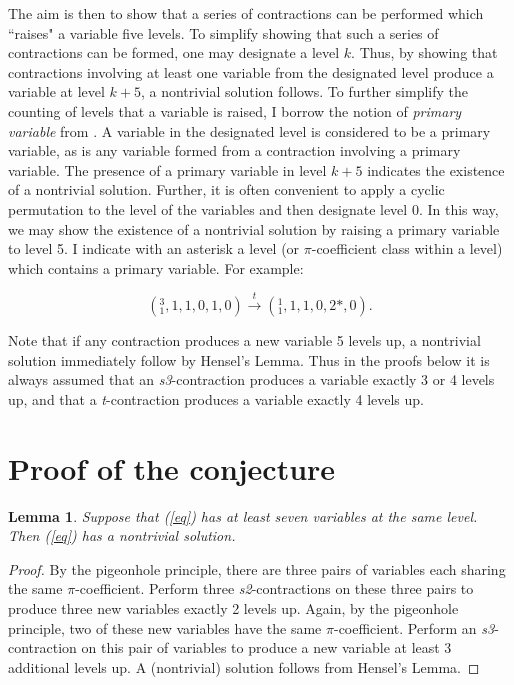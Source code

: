 \documentclass[draft]{publmathdeb}
\newtheorem{lemma}{Lemma}
\begin{document}
The aim is then to show that a series of contractions can be performed which ``raises" a variable five levels.  To simplify showing that such a series of contractions can be formed, one may designate a level $k$.  Thus, by showing that contractions involving at least one variable from the designated level produce a variable at level $k+5$, a nontrivial solution follows.  To further simplify the counting of levels that a variable is raised, I borrow the notion of \textit{primary variable} from \cite{davenport1963homogeneous}.  A variable in the designated level is considered to be a primary variable, as is any variable formed from a contraction involving a primary variable.  The presence of a primary variable in level $k+5$ indicates the existence of a nontrivial solution.  Further, it is often convenient to apply a cyclic permutation to the level of the variables and then designate level 0.  In this way, we may show the existence of a nontrivial solution by raising a primary variable to level 5.  I indicate with an asterisk a level (or $\pi$-coefficient class within a level) which contains a primary variable.  For example:

$$(^3_1, 1, 1, 0, 1, 0) \xrightarrow{t} (^1_1, 1, 1, 0, 2*, 0).$$

Note that if any contraction produces a new variable 5 levels up, a nontrivial solution immediately follow by Hensel's Lemma.  Thus in the proofs below it is always assumed that an \textit{s3}-contraction produces a variable exactly 3 or 4 levels up, and that a \textit{t}-contraction produces a variable exactly 4 levels up.

\section{Proof of the conjecture}

\begin{lemma} \label{max7}
Suppose that (\ref{eq}) has at least seven variables at the same level. Then (\ref{eq}) has a nontrivial solution.
\end{lemma}
\begin{proof}
By the pigeonhole principle, there are three pairs of variables each sharing the same $\pi$-coefficient.  Perform three \textit{s2}-contractions on these three pairs to produce three new variables exactly 2 levels up.  Again, by the pigeonhole principle, two of these new variables have the same $\pi$-coefficient.  Perform an \textit{s3}-contraction on this pair of variables to produce a new variable at least 3 additional levels up.  A (nontrivial) solution follows from Hensel's Lemma.
\end{proof}
\end{document}

